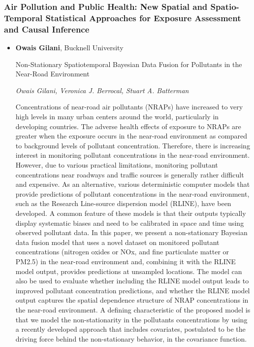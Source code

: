 \subsubsection*{Air Pollution and Public Health: New Spatial and Spatio-Temporal Statistical Approaches for Exposure Assessment and Causal Inference}

\begin{itemize}
\item \textbf{Owais Gilani}, Bucknell University

Non-Stationary Spatiotemporal Bayesian Data Fusion for Pollutants in the Near-Road Environment

\emph{\footnotesize Owais Gilani, Veronica J. Berrocal, Stuart A. Batterman}

Concentrations of near-road air pollutants (NRAPs) have increased to very high levels in many urban centers around the world, particularly in developing countries. The adverse health effects of exposure to NRAPs are greater when the exposure occurs in the near-road environment as compared to background levels of pollutant concentration. Therefore, there is increasing interest in monitoring pollutant concentrations in the near-road environment. However, due to various practical limitations, monitoring pollutant concentrations near roadways and traffic sources is generally rather difficult and expensive. As an alternative, various deterministic computer models that provide predictions of pollutant concentrations in the near-road environment, such as the Research Line-source dispersion model (RLINE), have been developed. A common feature of these models is that their outputs typically display systematic biases and need to be calibrated in space and time using observed pollutant data. In this paper, we present a non-stationary Bayesian data fusion model that uses a novel dataset on monitored pollutant concentrations (nitrogen oxides  or NOx, and fine particulate matter or PM2.5) in the near-road environment and, combining it with the RLINE model output, provides predictions at unsampled locations. The model can also be used to evaluate whether including the RLINE model output leads to improved pollutant concentration predictions, and whether the RLINE model output captures the spatial dependence structure of NRAP concentrations in the near-road environment. A defining characteristic of the proposed model is that we model the non-stationarity in the pollutants concentrations by using a recently developed approach that includes covariates, postulated to be the driving force behind the non-stationary behavior, in the covariance function.


\end{itemize}
